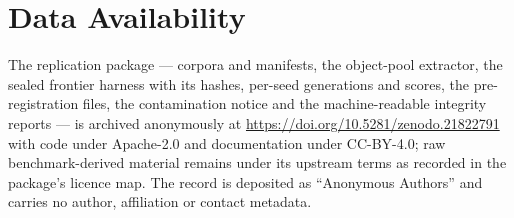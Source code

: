 \documentclass[conference]{IEEEtran}
\begin{document}
\section*{Data Availability}
The replication package --- corpora and manifests, the object-pool extractor, the
sealed frontier harness with its hashes, per-seed generations and scores, the
pre-registration files, the contamination notice and the machine-readable
integrity reports --- is archived anonymously at
\mbox{\url{https://doi.org/10.5281/zenodo.21822791}} with code under Apache-2.0 and documentation under CC-BY-4.0; raw
benchmark-derived material remains under its upstream terms as recorded in the
package's licence map. The record is deposited as ``Anonymous Authors'' and carries no
author, affiliation or contact metadata.



\end{document}
